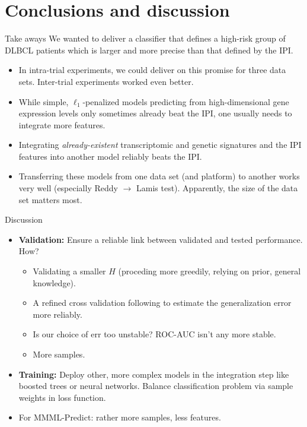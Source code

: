 \documentclass[10pt, aspectratio=169]{beamer}
\begin{document}
\section{Conclusions and discussion}
\begin{frame}{Take aways}
  We wanted to deliver a classifier that defines a high-risk group of DLBCL 
  patients which is larger and more precise than that defined by the IPI.
  \begin{itemize}
    \item In intra-trial experiments, we could deliver on this promise for three 
      data sets. Inter-trial experiments worked even better.
    \item While simple, $\ell_1$-penalized models predicting from 
      high-dimensional gene expression levels only sometimes already beat 
      the IPI, one usually needs to integrate more features.
    \item Integrating \textit{already-existent} transcriptomic and genetic 
      signatures and the IPI features into another model reliably beats the IPI.
    \item Transferring these models from one data set (and platform) to another
      works very well (especially Reddy $\to$ Lamis test). Apparently, the
      size of the data set matters most.
  \end{itemize}
\end{frame}

\begin{frame}{Discussion}
  \begin{itemize}
    \item \textbf{Validation:} Ensure a reliable link between validated and 
      tested performance. How? %
      \begin{itemize}
        \item Validating a smaller $H$ (proceding more greedily, relying on 
          prior, general knowledge).
        \item A refined cross validation following \citep{nested-cv-hastie} to 
          estimate the generalization error more reliably.
        \item Is our choice of $\text{err}$ too unstable? ROC-AUC isn't any 
          more stable.
        \item More samples.
      \end{itemize}
    \item \textbf{Training:} Deploy other, more complex models in the 
      integration step like boosted trees or neural networks. Balance 
      classification problem via sample weights in loss function.
    \item For MMML-Predict: rather more samples, less features.
  \end{itemize}
\end{frame}
\end{document}
